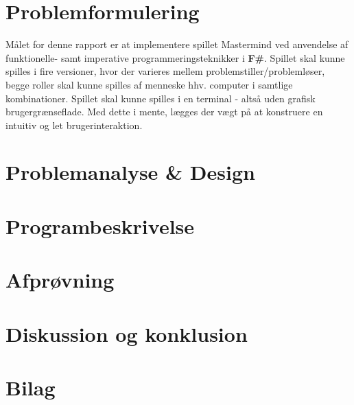 \documentclass[a4paper,10pt]{article}
\begin{document}
\section{Problemformulering}

Målet for denne rapport er at implementere spillet Mastermind ved anvendelse af funktionelle- samt imperative programmeringsteknikker i \textbf{F\#}. Spillet skal kunne spilles i fire versioner, hvor der varieres mellem problemstiller/problemløser, begge roller skal kunne spilles af menneske hhv. computer i samtlige kombinationer. Spillet skal kunne spilles i en terminal - altså uden grafisk brugergrænseflade. Med dette i mente, lægges der vægt på at konstruere en intuitiv og let brugerinteraktion. 

\section{Problemanalyse \& Design}

\section{Programbeskrivelse}

\section{Afprøvning}

\section{Diskussion og konklusion}

\section*{Bilag}
\end{document}
